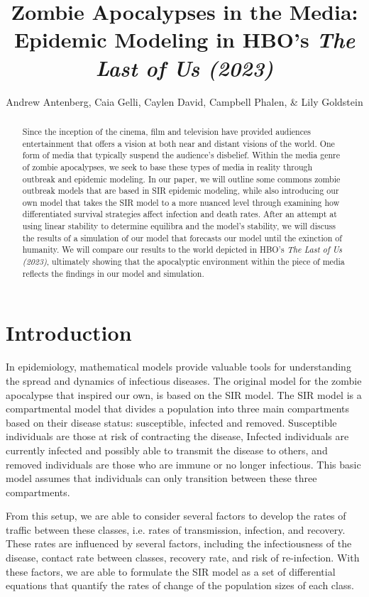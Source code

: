 \documentclass{article}
\title{Zombie Apocalypses in the Media: Epidemic Modeling in HBO's \textit{The Last of Us (2023)}}
\author{Andrew Antenberg, Caia Gelli, Caylen David, Campbell Phalen, \& Lily Goldstein}
\begin{document}
\maketitle

\begin{abstract}
Since the inception of the cinema, film and television have provided audiences entertainment that offers a vision at both near and distant visions of the world. One form of media that typically suspend the audience's disbelief. Within the media genre of zombie apocalypses, we seek to base these types of media in reality through outbreak and epidemic modeling. In our paper, we will outline some commons zombie outbreak models that are based in SIR epidemic modeling, while also introducing our own model that takes the SIR model to a more nuanced level through examining how differentiated survival strategies affect infection and death rates. After an attempt at using linear stability to determine equilibra and the model's stability, we will discuss the results of a simulation of our model that forecasts our model until the exinction of humanity. We will compare our results to the world depicted in HBO's \textit{The Last of Us (2023)}, ultimately showing that the apocalyptic environment within the piece of media reflects the findings in our model and simulation. 
\end{abstract}

\section{Introduction}

In epidemiology, mathematical models provide valuable tools for understanding the spread and dynamics of infectious diseases. The original model for the zombie apocalypse that inspired our own, is based on the SIR model. The SIR model is a compartmental model that divides a population into three main compartments based on their disease status: susceptible, infected and removed. Susceptible individuals are those at risk of contracting the disease, Infected individuals are currently infected and possibly able to transmit the disease to others, and removed individuals are those who are immune or no longer infectious. This basic model assumes that individuals can only transition between these three compartments.

From this setup, we are able to consider several factors to develop the rates of traffic between these classes, i.e. rates of transmission, infection, and recovery. These rates are influenced by several factors, including the infectiousness of the disease, contact rate between classes, recovery rate, and risk of re-infection. With these factors, we are able to formulate the SIR model as a set of differential equations that quantify the rates of change of the population sizes of each class.
\end{document}
